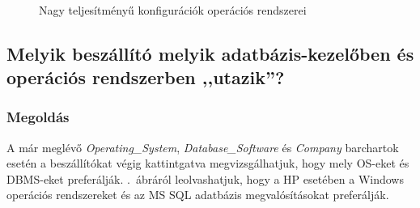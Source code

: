 \documentclass[a4paper,10pt,titlepage]{article}
\begin{document}
\begin{figure}[h!]
  \centering
  ~~~ %
  \caption{Nagy teljesítményű konfigurációk operációs rendszerei}
  \label{fig:tpmc_felso_kategoria_os}
\end{figure}

\subsection{Melyik beszállító melyik adatbázis-kezelőben és operációs rendszerben ,,utazik''?}
\subsubsection*{Megoldás}
A már meglévő \emph{Operating\_System}, \emph{Database\_Software} és \emph{Company} barchartok esetén a beszállítókat végig kattintgatva megvizsgálhatjuk, hogy mely OS-eket és DBMS-eket preferálják. .~ábráról leolvashatjuk, hogy a HP esetében a Windows operációs rendszereket és az MS SQL adatbázis megvalósításokat preferálják.
\end{document}

